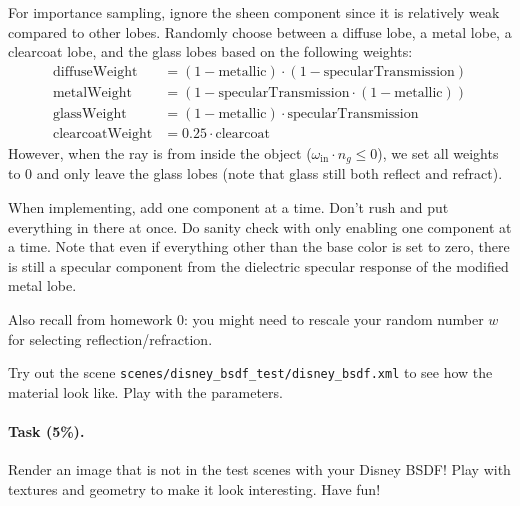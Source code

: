 For importance sampling, ignore the sheen component since it is relatively weak compared to other lobes. Randomly choose between a diffuse lobe, a metal lobe, a clearcoat lobe, and the glass lobes based on the following weights:
\begin{equation}
\begin{aligned}
\text{diffuseWeight} &= (1 - \text{metallic}) \cdot (1 - \text{specularTransmission}) \\
\text{metalWeight} &= (1 - \text{specularTransmission} \cdot (1 - \text{metallic})) \\
\text{glassWeight} &= (1 - \text{metallic}) \cdot \text{specularTransmission} \\
\text{clearcoatWeight} &= 0.25 \cdot \text{clearcoat}
\end{aligned}
\end{equation}
However, when the ray is from inside the object ($\omega_{\text{in}} \cdot n_g \leq 0$), we set all weights
to $0$ and only leave the glass lobes (note that glass still both reflect and refract).

When implementing, add one component at a time. Don't rush and put everything in there at once. Do sanity check with only enabling one component at a time. Note that even if everything other than the base color is set to zero, there is still a specular component from the dielectric specular response of the modified metal lobe. 

Also recall from homework 0: you might need to rescale your random number $w$ for selecting reflection/refraction.

Try out the scene \lstinline{scenes/disney_bsdf_test/disney_bsdf.xml} to see how the material look like. Play with the parameters.

\paragraph{Task (5\%).} Render an image that is not in the test scenes with your Disney BSDF! Play with textures and geometry to make it look interesting. Have fun!




